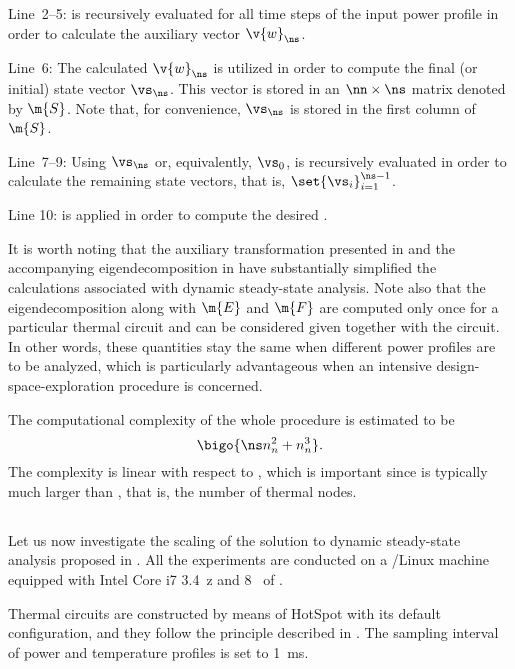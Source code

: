Line~2--5:  is recursively evaluated
for all time steps of the input power profile \mp in order to calculate the
auxiliary vector $\v{w}_\ns$.

Line~6: The calculated $\v{w}_\ns$ is utilized in order to compute the final (or
initial) state vector $\vs_\ns$. This vector is stored in an $\nn \times \ns$
matrix denoted by $\m{S}$. Note that, for convenience, $\vs_\ns$ is stored in
the first column of $\m{S}$.

Line~7--9: Using $\vs_\ns$ or, equivalently, $\vs_0$,
 is recursively evaluated in order to calculate
the remaining state vectors, that is, $\set{\vs_i}_{i = 1}^{\ns - 1}$.

Line 10:  is applied in order to compute the desired
\mq.

It is worth noting that the auxiliary transformation presented in
 and the accompanying eigendecomposition in
 have substantially simplified the calculations
associated with dynamic steady-state analysis. Note also that the
eigendecomposition along with $\m{E}$ and $\m{F}$ are computed only once for a
particular thermal  circuit and can be considered given together with the
circuit. In other words, these quantities stay the same when different power
profiles are to be analyzed, which is particularly advantageous when an
intensive design-space-exploration procedure is concerned.

The computational complexity of the whole procedure is estimated to be
\[
  \bigo{\ns n_n^2 + n_n^3}.
\]
The complexity is linear with respect to \ns, which is important since \ns is
typically much larger than \nn, that is, the number of thermal nodes.

\subsection{\resultstitle}

Let us now investigate the scaling of the solution to dynamic steady-state
analysis proposed in . All the experiments are
conducted on a /Linux machine equipped with Intel Core i7 3.4~z
and 8~ of .

Thermal  circuits are constructed by means of HotSpot \cite{skadron2003}
with its default configuration, and they follow the principle described in
. The sampling interval \dt of power and temperature
profiles is set to 1~ms.

